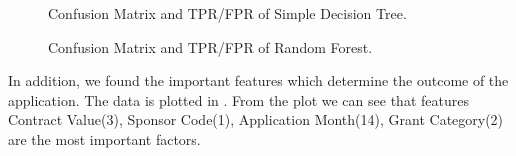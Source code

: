 \documentclass{article} %
\begin{document}
\begin{figure}[h]
	\begin{center}
	\end{center}
	\caption{Confusion Matrix and TPR/FPR of Simple Decision Tree.}
\end{figure}

\begin{figure}[h]
	\begin{center}
	\end{center}
	\caption{Confusion Matrix and TPR/FPR of Random Forest.}
\end{figure}

In addition, we found the important features which determine the outcome of the application. The data is plotted in . From the plot we can see that features Contract Value(3), Sponsor Code(1), Application Month(14), Grant Category(2) are the most important factors.
\end{document}
